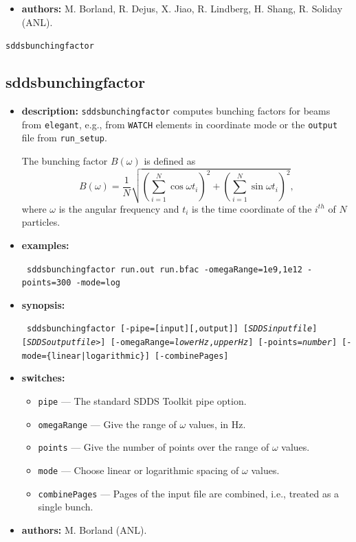 \documentclass[11pt]{article}
\begin{document}
\begin{itemize}
\item {\bf authors:} M. Borland, R. Dejus, X. Jiao, R. Lindberg, H. Shang, R. Soliday (ANL).
\end{itemize}

\newpage
\begin{center}{\Large\verb|sddsbunchingfactor|}\end{center}
\subsection{sddsbunchingfactor}

\begin{itemize}
\item {\bf description:} {\tt sddsbunchingfactor} computes bunching factors for 
beams from {\tt elegant}, e.g., from \verb|WATCH| elements in coordinate mode or
the \verb|output| file from \verb|run_setup|.

The bunching factor $B(\omega)$ is defined as
\begin{equation}
B(\omega) = \frac{1}{N}\sqrt{\left(\sum_{i=1}^N \cos \omega t_i\right)^2 + \left(\sum_{i=1}^N \sin\omega t_i\right)^2},
\end{equation}
where $\omega$ is the angular frequency and $t_i$ is the time coordinate of the $i^{th}$ of $N$ particles.

\item {\bf examples:}
\begin{flushleft}{\tt
sddsbunchingfactor run.out run.bfac -omegaRange=1e9,1e12 -points=300 -mode=log
}\end{flushleft}

\item {\bf synopsis:}
\begin{flushleft}{\tt
sddsbunchingfactor [-pipe=[input][,output]] [{\em SDDSinputfile}] [{\em SDDSoutputfile>}]
  [-omegaRange={\em lowerHz},{\em upperHz}] [-points={\em number}] [-mode=\{linear|logarithmic\}] 
  [-combinePages]
}\end{flushleft}

\item {\bf switches:}
\begin{itemize}
\item {\tt pipe} --- The standard SDDS Toolkit pipe option.
\item {\tt omegaRange} --- Give the range of $\omega$ values, in Hz.
\item {\tt points} --- Give the number of points over the range of $\omega$ values.
\item {\tt mode} --- Choose linear or logarithmic spacing of $\omega$ values.
\item {\tt combinePages} --- Pages of the input file are combined, i.e., treated as a single bunch.
\end{itemize}

\item {\bf authors:} M. Borland (ANL).
\end{itemize}
\end{document}
